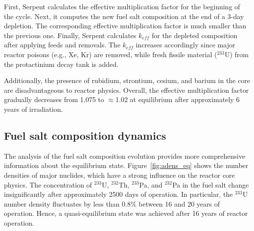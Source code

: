 First, Serpent calculates the effective multiplication factor for the  
beginning of the cycle. 
Next, it computes the new fuel salt composition at the end of a 3-day 
depletion. The corresponding effective multiplication factor is much smaller 
than the previous one. Finally, Serpent calculates $k_{eff}$ for the depleted 
composition after applying feeds and removals. The $k_{eff}$ increases 
accordingly since major reactor poisons (e.g., Xe, Kr) are removed, while 
fresh fissile material ($^{233}$U) from the protactinium decay tank is added.  

Additionally, the presence of rubidium, strontium, cesium, and barium in the 
core are disadvantageous to reactor physics. Overall, the effective 
multiplication factor gradually decreases from 1.075 to $\approx$1.02 at 
equilibrium after approximately 6 years of irradiation. 



\subsection{Fuel salt composition dynamics}
The analysis of the fuel salt composition evolution provides more 
comprehensive information about the equilibrium state. 
Figure~\ref{fig:adens_eq} shows the number densities of major nuclides, which 
have a strong influence on the reactor core physics. The concentration of 
$^{233}$U, $^{232}$Th, $^{233}$Pa, and $^{232}$Pa in the fuel salt change 
insignificantly after approximately 2500 days of operation. In particular, the 
$^{233}$U number density fluctuates by less than 0.8\% between 16 and 20 years 
of operation. Hence, a quasi-equilibrium state was achieved after 16 years of 
reactor operation.

